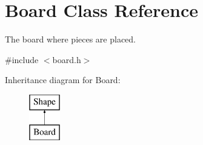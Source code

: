 \hypertarget{class_board}{}\section{Board Class Reference}
\label{class_board}


The board where pieces are placed.  




{\ttfamily \#include $<$board.\+h$>$}

Inheritance diagram for Board\+:\begin{figure}[H]
\begin{center}
\leavevmode
\includegraphics[height=2.000000cm]{class_board}
\end{center}
\end{figure}

